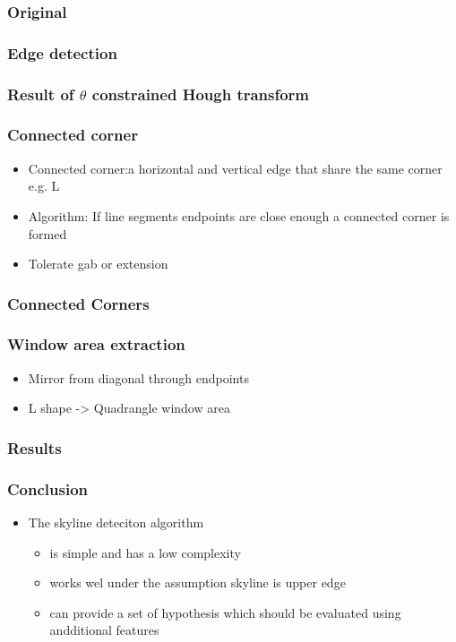 \documentclass{beamer}
\begin{document}
\frame
{
	\frametitle{Original}
}

\frame
{
	\frametitle{Edge detection}
}

\frame
{
	\frametitle{Result of $\theta$ constrained Hough transform}
}

\frame
{
	\frametitle{Connected corner}
	\begin{itemize}
	\item Connected corner:a horizontal and vertical edge that share the same
	corner e.g. L
	\item Algorithm: If line segments endpoints are close enough a connected corner is formed
	\item Tolerate gab or extension
	\end{itemize}
}

\frame
{
	\frametitle{Connected Corners}

}

\frame
{
	\frametitle{Window area extraction}
	\begin{itemize}
	\item Mirror from diagonal through endpoints
	\item L shape -> Quadrangle window area
	\end{itemize}
}

\frame
{
	\frametitle{Results}
}

\frame
{
	\frametitle{Conclusion}
	\begin{itemize}
	\item The skyline deteciton algorithm 
		\begin{itemize}
		\item is simple and has a low complexity
		\item works wel under the assumption skyline is upper edge
		\item can provide a set of hypothesis which should be evaluated using andditional features
		\end{itemize}
	\end{itemize}
}
\end{document}
